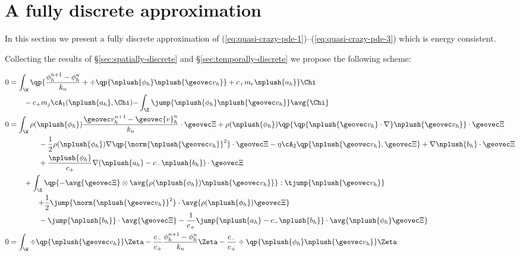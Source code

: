 \documentclass[final]{amsart}
\numberwithin{equation}{section}
\begin{document}
\section{A fully discrete approximation}
\label{sec:fully-discrete}

In this section we present a fully discrete approximation of
(\ref{eq:quasi-crazy-pde-1})--(\ref{eq:quasi-crazy-pde-3}) which is
energy consistent.

Collecting the results of \S\ref{sec:spatially-discrete} and
\S\ref{sec:temporally-discrete} we propose the following scheme:

\begin{equation}
  \label{eq:fully-discrete-mixed-form}
  \begin{split}
    0
    &=
    \int_\W \qp{\frac{\phi_h^{n+1}-\phi_h^n}{k_n} + \div\qp{\nplush{\phi_h}\nplush{\geovec v_h}} + c_ + m_r \nplush{a_h}} \Chi 
    \\
    &\qquad
    - c_+ m_j \cA_1(\nplush{a_h},\Chi)
    {-}\int_\E \jump{\nplush{\phi_h} \nplush{\geovec v_h}}\avg{\Chi}
    \\
    0 &=
    \int_\W 
    \rho(\nplush{\phi_h}) \frac{\geovec v_h^{n+1} - {\geovec{v}}_h^n}{k_n} \cdot \geovec \Xi
    +
    \rho(\nplush{\phi_h}) \qp{ \qp{\nplush{\geovec v_h} \cdot \nabla }\nplush{\geovec v_h}} \cdot \geovec \Xi
    \\
    &\qquad\qquad-
    \frac{1}{2} \rho(\nplush{\phi_h}) \nabla\qp{\norm{\nplush{\geovec v_h}}^2} \cdot \geovec \Xi
    -
    \eta\cA_2\qp{{\nplush{\geovec v_h}},{\geovec \Xi}}
    +
    \nabla \nplush{b_h} \cdot \geovec \Xi
    \\
    &\qquad\qquad +
    \frac{\nplush{\phi_h}}{c_+}\nabla(\nplush{a_h} - c_- \nplush{b_h}) \cdot \geovec \Xi
    \\
    & \qquad +
    \int_\E
    \qp{{-}\avg{ \geovec \Xi} \otimes \avg{ \rho(\nplush{\phi_h}) \nplush{\geovec v_h}}}: \tjump{\nplush{\geovec v_h}} 
    \\&\qquad \qquad {+}
    \frac{1}{2} \jump{\norm{\nplush{\geovec v_h}}^2}\cdot \avg{\rho(\nplush{\phi_h}) \geovec \Xi}
    \\ 
    &\qquad\qquad
    -
    \jump{\nplush{b_h}} \cdot \avg{\geovec \Xi}
    -
    \frac{1}{c_+}\jump{\nplush{ a_h} - c_-\nplush{ b_h}} \cdot \avg{\nplush{\phi_h} \geovec \Xi}
    \\
    0 &= 
    \int_\W 
    \div\qp{\nplush{\geovec v_h}} \Zeta
    -
    \frac{c_-}{c_+}\frac{\phi_h^{n+1}-\phi_h^n}{k_n} \Zeta
    -
    \frac{c_-}{c_+} \div\qp{\nplush{\phi_h}\nplush{\geovec v_h}} \Zeta

\end{split}
\end{equation}
\end{document}
